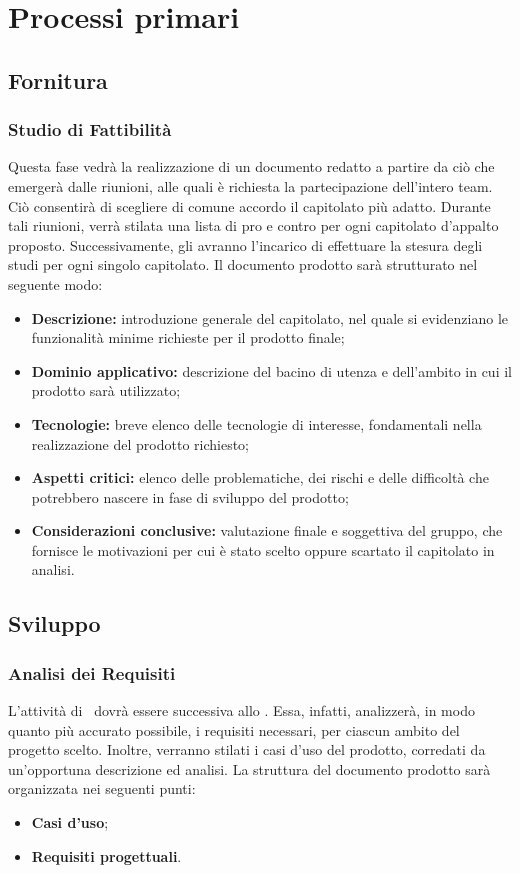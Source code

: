\newpage
\section{Processi primari}

	\subsection{Fornitura}
		\subsubsection{Studio di Fattibilità}
		Questa fase vedrà la realizzazione di un documento redatto a partire da ciò che emergerà dalle riunioni, alle quali è richiesta la partecipazione dell'intero team. Ciò consentirà di scegliere di comune accordo il capitolato più adatto. Durante tali riunioni, verrà stilata una lista di pro e contro per ogni capitolato d'appalto proposto. Successivamente, gli \textit{\Anas} avranno l'incarico di effettuare la stesura degli studi per ogni singolo capitolato. Il documento prodotto sarà strutturato nel seguente modo:
		\begin{itemize}
		\item \textbf{Descrizione:} introduzione generale del capitolato, nel quale si evidenziano le funzionalità minime richieste per il prodotto finale;
		\item \textbf{Dominio applicativo:} descrizione del bacino di utenza e dell'ambito in cui il prodotto sarà utilizzato;
		\item \textbf{Tecnologie:} breve elenco delle tecnologie di interesse, fondamentali nella realizzazione del prodotto richiesto;
		\item \textbf{Aspetti critici:} elenco delle problematiche, dei rischi e delle difficoltà che potrebbero nascere in fase di sviluppo del prodotto;
		\item \textbf{Considerazioni conclusive:} valutazione finale e soggettiva del gruppo, che fornisce le motivazioni per cui è stato scelto oppure scartato il capitolato in analisi.
		\end{itemize}

	\subsection{Sviluppo}
	
		\subsubsection{Analisi dei Requisiti}
		L'attività di \AdR\ dovrà essere successiva allo \SdF. Essa, infatti, analizzerà, in modo quanto più accurato possibile, i requisiti necessari, per ciascun ambito del progetto scelto. Inoltre, verranno stilati i casi d'uso del prodotto, corredati da un'opportuna descrizione ed analisi. La struttura del documento prodotto sarà organizzata nei seguenti punti:
		\begin{itemize}
			\item \textbf{Casi d'uso};
			\item \textbf{Requisiti progettuali}.
		\end{itemize}
		
